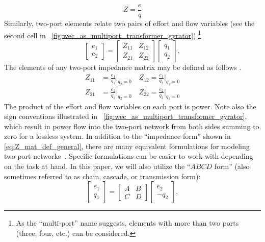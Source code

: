 \documentclass[lettersize,journal]{IEEEtran}
\begin{document}
%
\begin{equation}
        Z = \frac{e}{q}
\end{equation}
%
Similarly, two-port elements relate two pairs of effort and flow variables (see the second cell in \figurename~\ref{fig:wec_as_multiport_transformer_gyrator}).\footnote{As the ``multi-port'' name suggests, elements with more than two ports (three, four, etc.) can be considered.}
%
\begin{equation} \label{eq:Z_mat_def_general}
        \begin{bmatrix} e_1 \\ e_2 \end{bmatrix} = \begin{bmatrix} Z_{11} & Z_{12} \\ Z_{21} & Z_{22} \end{bmatrix} \begin{bmatrix} q_1 \\ q_2 \end{bmatrix},
\end{equation}
%
The elements of any two-port impedance matrix may be defined as follows \cite{CircuitFundamental}.
%
\begin{equation} \label{eq:Z_mat_elements_def}
        \begin{aligned}
                Z_{11}& = \frac{e_1}{q_1} \bigg \vert_{q_2=0} \quad
                Z_{12} = \frac{e_1}{q_2} \bigg \vert_{q_1=0}  \\[1em]
                Z_{21}& = \frac{e_2}{q_1} \bigg \vert_{q_2=0} \quad
                Z_{22} = \frac{e_2}{q_2} \bigg \vert_{q_1=0} 
        \end{aligned}
\end{equation}
%
The product of the effort and flow variables on each port is power.
Note also the sign conventions illustrated in \figurename~\ref{fig:wec_as_multiport_transformer_gyrator}, which result in power flow into the two-port network from both sides summing to zero for a lossless system.
%
In addition to the ``impedance form'' shown in \eqref{eq:Z_mat_def_general}, there are many equivalent formulations for modeling two-port networks~\cite{CircuitFundamental}.
Specific formulations can be easier to work with depending on the task at hand.
In this paper, we will also utilize the ``$ABCD$ form'' (also sometimes referred to as chain, cascade, or transmission form):
%
\begin{equation}
        \label{eq:abcd_mat_def_general}
        \begin{bmatrix} e_1 \\ q_1 \end{bmatrix}
        = 
        \begin{bmatrix} A & B \\ C & D \end{bmatrix}
        \begin{bmatrix} e_2 \\ - q_2 \end{bmatrix},
\end{equation}
\end{document}

